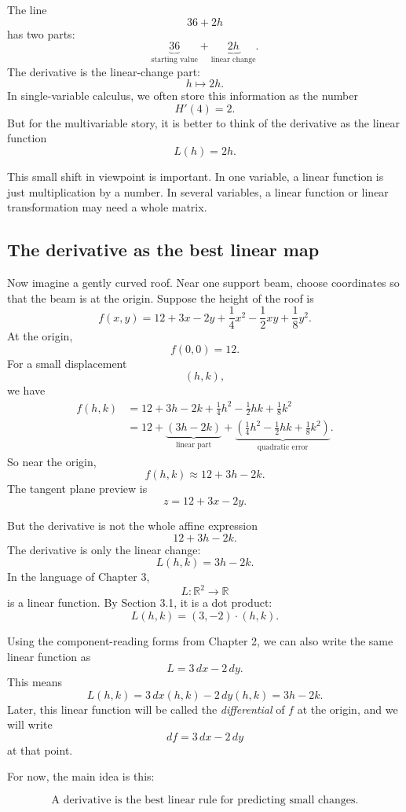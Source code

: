 The line
\[
    36+2h
\]
has two parts:
\[
    \underbrace{36}_{\text{starting value}}
    +
    \underbrace{2h}_{\text{linear change}}.
\]
The derivative is the linear-change part:
\[
    h\longmapsto 2h.
\]
In single-variable calculus, we often store this information as the number
\[
    H'(4)=2.
\]
But for the multivariable story, it is better to think of the derivative as the linear
function
\[
    L(h)=2h.
\]

This small shift in viewpoint is important.  In one variable, a linear function is just
multiplication by a number.  In several variables, a linear function or linear
transformation may need a whole matrix.

\subsection{The derivative as the best linear map}

Now imagine a gently curved roof.  Near one support beam, choose coordinates so that
the beam is at the origin.  Suppose the height of the roof is
\[
    f(x,y)=12+3x-2y+\frac14x^2-\frac12xy+\frac18y^2.
\]
At the origin,
\[
    f(0,0)=12.
\]
For a small displacement
\[
    (h,k),
\]
we have
\[
\begin{aligned}
f(h,k)
&=
12+3h-2k+\frac14h^2-\frac12hk+\frac18k^2\\
&=
12+\underbrace{(3h-2k)}_{\text{linear part}}
+
\underbrace{\left(\frac14h^2-\frac12hk+\frac18k^2\right)}_{\text{quadratic error}}.
\end{aligned}
\]
So near the origin,
\[
    f(h,k)\approx 12+3h-2k.
\]
The tangent plane preview is
\[
    z=12+3x-2y.
\]

But the derivative is not the whole affine expression
\[
    12+3h-2k.
\]
The derivative is only the linear change:
\[
    L(h,k)=3h-2k.
\]
In the language of Chapter 3,
\[
    L:\mathbb R^2\to\mathbb R
\]
is a linear function.  By Section 3.1, it is a dot product:
\[
    L(h,k)=(3,-2)\cdot(h,k).
\]

Using the component-reading forms from Chapter 2, we can also write the same linear
function as
\[
    L=3\,dx-2\,dy.
\]
This means
\[
    L(h,k)=3\,dx(h,k)-2\,dy(h,k)=3h-2k.
\]
Later, this linear function will be called the \emph{differential} of \(f\) at the origin,
and we will write
\[
    df=3\,dx-2\,dy
\]
at that point.

For now, the main idea is this:

\[
\boxed{
\text{A derivative is the best linear rule for predicting small changes.}
}
\]

